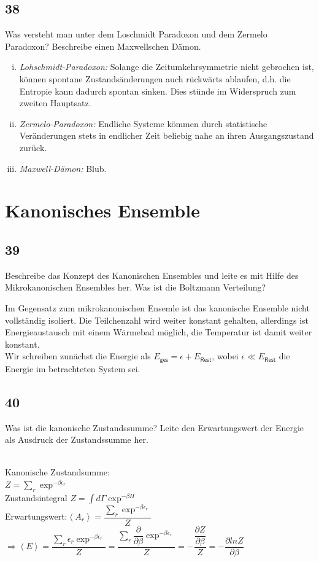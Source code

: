 \documentclass[12pt,a4paper]{report}
\newenvironment{myfrag}{\begin{it}}{\end{it}\vspace{3mm}\par}
\numberwithin{equation}{section}
\begin{document}
\subsection{38}
\begin{myfrag}
Was versteht man unter dem Loschmidt Paradoxon und dem Zermelo Paradoxon?
Beschreibe einen Maxwellschen Dämon.
\end{myfrag}
\begin{enumerate}[(i)]
\item\textit{Lohschmidt-Paradoxon:} Solange die Zeitumkehrsymmetrie nicht gebrochen ist, können spontane Zustandsänderungen auch rückwärts ablaufen, d.h. die Entropie kann dadurch spontan sinken. Dies stünde im Widerspruch zum zweiten Hauptsatz.
\item\textit{Zermelo-Paradoxon:} Endliche Systeme kömmen durch statistische Veränderungen stets in endlicher Zeit beliebig nahe an ihren Ausgangszustand zurück.
\item\textit{Maxwell-Dämon:} Blub.
\end{enumerate}
\section{Kanonisches Ensemble}
\subsection{39}
\begin{myfrag}
Beschreibe das Konzept des Kanonischen Ensembles und leite es mit Hilfe des
Mikrokanonischen Ensembles her. Was ist die Boltzmann Verteilung?
\end{myfrag}
Im Gegensatz zum mikrokanonischen Ensemle ist das kanonische Ensemble nicht vollständig isoliert. Die Teilchenzahl wird weiter konstant gehalten, allerdings ist Energieaustausch mit einem Wärmebad möglich, die Temperatur ist damit weiter konstant.\\
Wir schreiben zunächst die Energie als $E_\mathsf{ges}=\epsilon+E_\mathsf{Rest}$, wobei $\epsilon\ll E_\mathsf{Rest}$ die Energie im betrachteten System sei.
\subsection{40}
\begin{myfrag}
Was ist die kanonische Zustandssumme? Leite den Erwartungswert der Energie
als Ausdruck der Zustandssumme her.
\end{myfrag} \quad \\
Kanonische Zustandsumme: \\
$ Z= \sum \limits_r \exp ^{-\beta \epsilon _r} $ \quad \\ Zustandsintegral  $Z = \int d \Gamma \exp ^{-\beta H} $ \\[1ex]
Erwartungswert:$ \left\langle A_r \right\rangle = \dfrac{\sum _r \exp ^{-\beta \epsilon _r}}{Z}$ \\[1ex]
$\Rightarrow \left\langle E \right\rangle = \dfrac{\sum _r \epsilon _r \exp ^{-\beta \epsilon _r}}{Z} = \dfrac{\sum _r \dfrac{\partial}{\partial \beta} \exp ^{-\beta \epsilon _r}}{Z} = -\dfrac{\dfrac{\partial Z}{\partial \beta}}{Z} = - \dfrac{\partial lnZ}{\partial \beta}$
\end{document}
